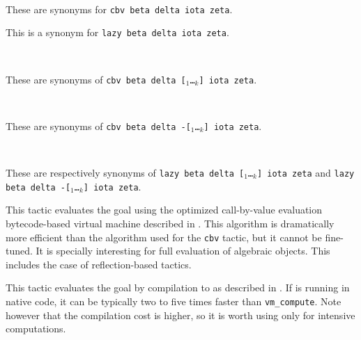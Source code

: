 \begin{Variants}
\item {} \\
      {}

  These are synonyms for {\tt cbv beta delta iota zeta}.

\item {}

  This is a synonym for {\tt lazy beta delta iota zeta}.

\item {}\\
      {}

  These are synonyms of {\tt cbv beta delta
  [\qualid$_1$\ldots\qualid$_k$] iota zeta}.

\item {}\\
      {}

  These are synonyms of {\tt cbv beta delta
  -[\qualid$_1$\ldots\qualid$_k$] iota zeta}.

\item {}\\
      {}

  These are respectively synonyms of {\tt lazy beta delta
  [\qualid$_1$\ldots\qualid$_k$] iota zeta} and {\tt lazy beta delta
  -[\qualid$_1$\ldots\qualid$_k$] iota zeta}.

\item {} 

  This tactic evaluates the goal using the optimized call-by-value evaluation
  bytecode-based virtual machine described in
  \cite{CompiledStrongReduction}. This algorithm is dramatically more efficient
  than the algorithm used for the {\tt cbv} tactic, but it cannot be
  fine-tuned. It is specially interesting for full evaluation of algebraic
  objects. This includes the case of reflection-based tactics.

\item {} 

  This tactic evaluates the goal by compilation to \ocaml{} as described in
  \cite{FullReduction}. If \Coq{} is running in native code, it can be typically
  two to five times faster than {\tt vm\_compute}. Note however that the
  compilation cost is higher, so it is worth using only for intensive
  computations.

\end{Variants}

